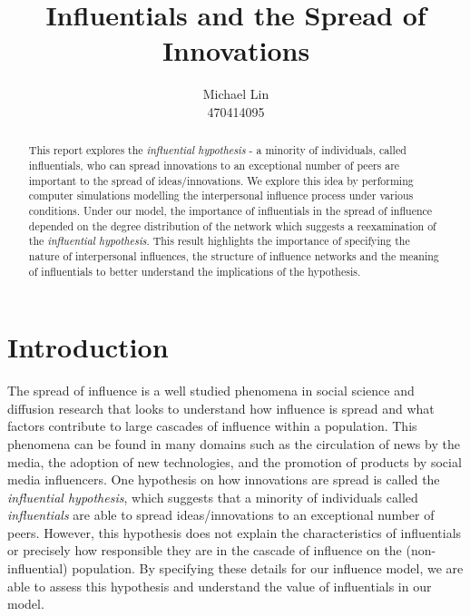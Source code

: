 \documentclass[10pt, oneside, reqno]{amsart}
\title{Influentials and the Spread of Innovations}                                %
\author{Michael Lin\\470414095}
\theoremstyle{plain}%
\theoremstyle{definition}
\theoremstyle{remark}
\begin{document}
\vspace*{-2cm}
\begin{abstract}
    This report explores the \textit{influential hypothesis} - a minority of individuals, called 
    influentials, who can spread innovations to an exceptional number of peers are important to 
    the spread of ideas/innovations. We explore this idea by performing computer simulations 
    modelling the interpersonal influence process under various conditions. 
    Under our model, the importance of influentials in the spread of influence depended on the degree distribution
    of the network which suggests a reexamination of the \textit{influential hypothesis}.
    This result highlights the importance of specifying the nature of interpersonal influences, the structure of influence networks and the meaning of influentials to better understand the implications of the hypothesis.
\end{abstract}
\maketitle 

\section{Introduction}

The spread of influence is a well studied phenomena in social science and diffusion research 
that looks to understand how influence is spread and what factors contribute to large cascades
of influence within a population. 
This phenomena can be found in many domains such as the circulation of news by the media, the 
adoption of new technologies, and the promotion of products by social media influencers.
One hypothesis on how innovations are spread is called the \textit{influential hypothesis}\cite{Influential},
which suggests that a minority of individuals called \textit{influentials} are able to spread 
ideas/innovations to an exceptional number of peers. 
However, this hypothesis does not explain the characteristics of influentials or precisely how 
responsible they are in the cascade of influence on the (non-influential) population.
By specifying these details for our influence model, we are able to assess this hypothesis and understand the value of influentials in our model.
\end{document}
